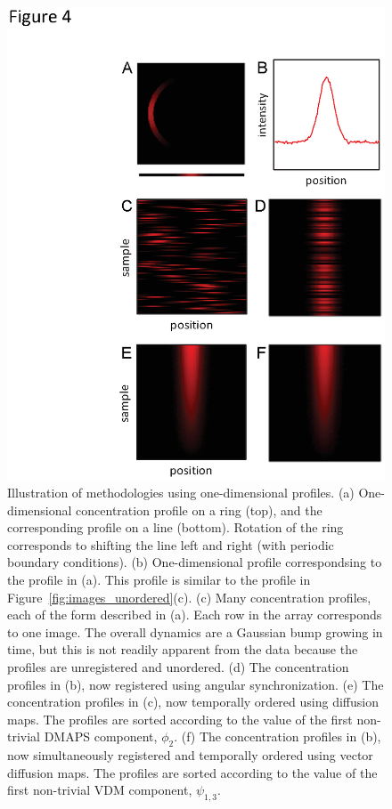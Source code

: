 \documentclass{pnastwo}
\begin{document}
\begin{figure}
\includegraphics{figures_0329_mac_4}
\caption{Illustration of methodologies using one-dimensional profiles. (a) One-dimensional concentration profile on a ring (top), and the corresponding profile on a line (bottom). Rotation of the ring corresponds to shifting the line left and right (with periodic boundary conditions). (b) One-dimensional profile correspondsing to the profile in (a). This profile is similar to the profile in Figure~\ref{fig:images_unordered}(c).  (c) Many concentration profiles, each of the form described in (a). Each row in the array corresponds to one image. The overall dynamics are a Gaussian bump growing in time, but this is not readily apparent from the data because the profiles are unregistered and unordered. (d) The concentration profiles in (b), now registered using angular synchronization. (e) The concentration profiles in (c), now temporally ordered using diffusion maps. The profiles are sorted according to the value of the first non-trivial DMAPS component, $\phi_2$. (f) The concentration profiles in (b), now simultaneously registered and temporally ordered using vector diffusion maps. The profiles are sorted according to the value of the first non-trivial VDM component, $\psi_{1, 3}$.}
\label{fig:1d_demo}
\end{figure}
\end{document}
